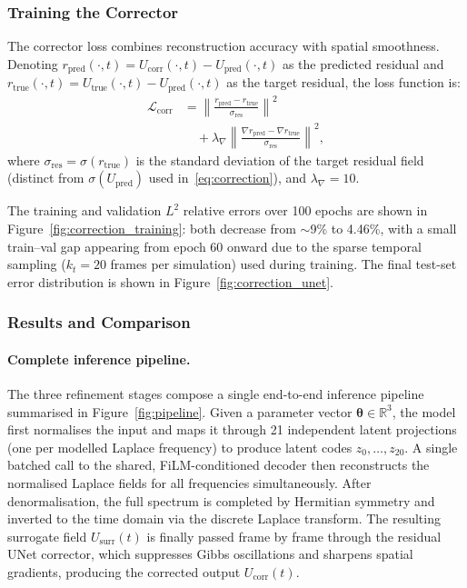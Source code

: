 \documentclass[a4paper, twocolumn]{article}
\newcommand{\vtheta}{\bm{\theta}}
\begin{document}
\subsubsection{Training the Corrector}

The corrector loss combines reconstruction accuracy with spatial smoothness. Denoting $r_{\mathrm{pred}}(\cdot,t) = U_{\mathrm{corr}}(\cdot,t) - U_{\mathrm{pred}}(\cdot,t)$ as the predicted residual and $r_{\mathrm{true}}(\cdot,t) = U_{\mathrm{true}}(\cdot,t) - U_{\mathrm{pred}}(\cdot,t)$ as the target residual, the loss function is:
\begin{equation}
\begin{split}
    \mathcal{L}_{\mathrm{corr}} &= \left\|\frac{r_{\mathrm{pred}} - r_{\mathrm{true}}}{\sigma_{\mathrm{res}}}\right\|^2 \\
    &\quad + \lambda_{\nabla}\left\|\frac{\nabla r_{\mathrm{pred}} - \nabla r_{\mathrm{true}}}{\sigma_{\mathrm{res}}}\right\|^2,
\end{split}
    \label{eq:corrloss}
\end{equation}
where $\sigma_{\mathrm{res}} = \sigma(r_{\mathrm{true}})$ is the standard deviation of the target residual field (distinct from $\sigma(U_{\mathrm{pred}})$ used in~\eqref{eq:correction}), and $\lambda_{\nabla} = 10$.

The training and validation $L^2$ relative errors over 100 epochs are shown in Figure~\ref{fig:correction_training}: both decrease from $\sim$9\% to 4.46\%, with a small train--val gap appearing from epoch 60 onward due to the sparse temporal sampling ($k_t = 20$ frames per simulation) used during training. The final test-set error distribution is shown in Figure~\ref{fig:correction_unet}.


\subsubsection{Results and Comparison}

\paragraph{Complete inference pipeline.}
The three refinement stages compose a single end-to-end inference pipeline summarised in Figure~\ref{fig:pipeline}. Given a parameter vector $\vtheta \in \mathbb{R}^3$, the model first normalises the input and maps it through 21 independent latent projections (one per modelled Laplace frequency) to produce latent codes $z_0, \ldots, z_{20}$. A single batched call to the shared, FiLM-conditioned decoder then reconstructs the normalised Laplace fields for all frequencies simultaneously. After denormalisation, the full spectrum is completed by Hermitian symmetry and inverted to the time domain via the discrete Laplace transform. The resulting surrogate field $U_{\mathrm{surr}}(t)$ is finally passed frame by frame through the residual UNet corrector, which suppresses Gibbs oscillations and sharpens spatial gradients, producing the corrected output $U_{\mathrm{corr}}(t)$.
\end{document}

